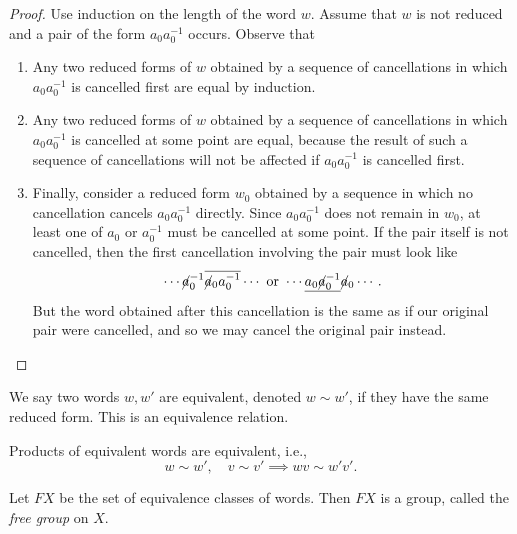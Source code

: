 \begin{proof}
  Use induction on the length of the word \( w \).
  Assume that \( w \) is not reduced and a pair of the form \( a_0 a^{-1}_0 \) occurs.
  Observe that
  \begin{enumerate}
    \item Any two reduced forms of \( w \) obtained by a sequence of cancellations in which \( a_0 a_0^{-1} \) is cancelled first are equal by induction.
    \item Any two reduced forms of \( w \) obtained by a sequence of cancellations in which \( a_0 a^{-1}_0 \) is cancelled at some point are equal, because the result of such a sequence of cancellations will not be affected if \( a_0 a_0^{-1} \) is cancelled first.
    \item Finally, consider a reduced form \( w_0 \) obtained by a sequence in which no cancellation cancels \( a_0 a_0^{-1} \) directly.
      Since \( a_0 a_0^{-1} \) does not remain in \( w_0 \), at least one of \( a_0 \) or \( a_0^{-1} \) must be cancelled at some point.
      If the pair itself is not cancelled, then the first cancellation involving the pair must look like
      \[
        \cdots \cancel{a}_0^{-1} \overline{\cancel{a}_0a_0^{-1}} \cdots \textmd{ or } \cdots \underline{a_0 \cancel{a}_0^{-1}} \cancel{a}_0 \cdots.
      \]
      But the word obtained after this cancellation is the same as if our original pair were cancelled, and so we may cancel the original pair instead.
  \end{enumerate}
\end{proof}

\begin{definition}
  We say two words \( w, w' \) are equivalent, denoted \( w \sim w' \), if they have the same reduced form.
  This is an equivalence relation.
\end{definition}

\begin{proposition}
  Products of equivalent words are equivalent, i.e.,
  \[
    w \sim w',\quad v \sim v' \implies wv \sim w'v'.
  \]
\end{proposition}

\begin{definition}
  Let \( FX \) be the set of equivalence classes of words.
  Then \( FX \) is a group, called the \emph{free group} on \( X \).
\end{definition}

